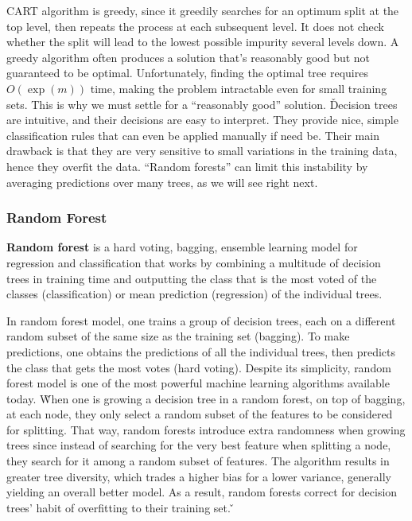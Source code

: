 CART algorithm is greedy, since it greedily searches for an optimum split at the top level, then repeats the process
at each subsequent level. It does not check whether the split will lead to the lowest possible impurity
several levels down. A greedy algorithm often produces a solution that's reasonably good but not guaranteed to be
optimal. Unfortunately, finding the optimal tree requires $O(\exp(m))$ time, making the problem intractable even for
small training sets. This is why we must settle for a ``reasonably good'' solution. \v

Decision trees are intuitive, and their decisions are easy to interpret. They provide nice, simple classification
rules that can even be applied manually if need be. Their main drawback is that they are very sensitive to small
variations in the training data, hence they overfit the data. ``Random forests'' can limit this instability by
averaging predictions over many trees, as we will see right next.

\subsubsection{Random Forest}

\textbf{Random forest} is a hard voting, bagging, ensemble learning model for regression and classification that works
by combining a multitude of decision trees in training time and outputting the class that is the most voted of the
classes (classification) or mean prediction (regression) of the individual trees.
\ed

In random forest model, one trains a group of decision trees, each on a different random subset of the same size as
the training set (bagging). To make predictions, one obtains the predictions of all the individual trees, then
predicts the class that gets the most votes (hard voting). Despite its simplicity, random forest model is one of the
most powerful machine learning algorithms available today. \v

When one is growing a decision tree in a random forest, on top of bagging, at each node, they only select a random
subset of the features to be considered for splitting. That way, random forests introduce extra randomness when
growing trees since instead of searching for the very best feature when splitting a node, they search for it among a
random subset of features. The algorithm results in greater tree diversity, which trades a higher bias for a lower
variance, generally yielding an overall better model. As a result, random forests correct for decision trees' habit
of overfitting to their training set. \v

